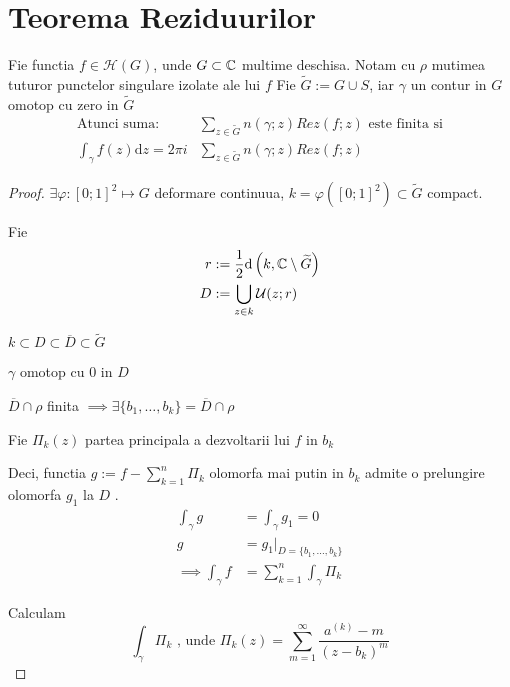 \section{Teorema Reziduurilor}

\begin{theorem}
    Fie functia $f\in \mathcal{H}(G)$, unde $G \subset \mathbb{C}$ multime deschisa.
    Notam cu $\rho$  mutimea tuturor punctelor singulare izolate ale lui $f$
    Fie $\widetilde{G}:=G \cup S $, iar $\gamma$ un contur in $G$ omotop cu zero
     in $\widetilde{G}$
    \begin{align*}
        \text{Atunci suma: }
        &\sum_{z \in \widetilde{G}} {n(\gamma;z) Rez(f;z)}
        \text{ este finita si}  \\
        \int_{\gamma} f(z) \mathrm{d}z = 2\pi i &\sum_{z \in \widetilde{G}} n(\gamma;z) Rez(f;z)
    \end{align*}
    \begin{proof}
        $\exists \varphi:[0;1]^2 \mapsto G$ deformare continuua,
        $k = \varphi ([0;1]^2) \subset \widetilde{G}$ compact.

        Fie
        \begin{align*}
            r &:= \frac{1}{2} \mathrm{d} \left(k, \mathbb{C} \setminus \widetilde{G}\right)
            \\
            D &:= \bigcup_{z\in k} \mathcal{U}(z;r)
        \end{align*}

        $k \subset D \subset \overline{D} \subset \widetilde{G}$

        $\gamma$ omotop cu $0$ in $D$

        $\overline{D} \cap \rho$ finita
                $\implies \exists \{b_1, \dotsc, b_k \} = \overline{D} \cap \rho$

        Fie $\Pi_{k}(z)$ partea principala a dezvoltarii lui $f$ in $b_k$

        Deci, functia $\displaystyle g := f - \sum_{k=1}^{n} \Pi_k$
        olomorfa mai putin in $b_k$ admite o prelungire olomorfa $g_1$ la $D$ .
        \begin{align*}
            \int_{\gamma}  g &= \int_{\gamma} g_1 = 0 \\
                           g &= g_1 |_{D=\{b_1, \dotsc, b_k\}}\\
            \implies \int_{\gamma} f &= \sum_{k=1}^{n} \int_{\gamma} \Pi_k
        \end{align*}

        Calculam
        \[
            \int_{\gamma} \Pi_k \text{ , unde }
            \Pi_k(z) = \sum_{m=1}^{\infty} \frac{a^{(k)} - m }{(z - b_k)^m}
        \]


\end{proof}
\end{theorem}
